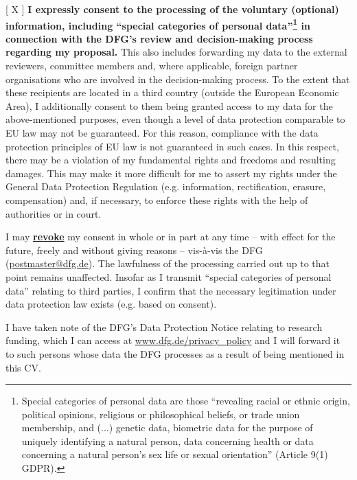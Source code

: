 \documentclass[english]{dfgcv}
\begin{document}
[ X ]
\textbf{I expressly consent to the processing of the voluntary (optional) information, including \enquote{special categories of personal data}\footnote{Special categories of personal data are those \enquote{revealing racial or ethnic origin, political opinions, religious or philosophical beliefs, or trade union membership, and (...) genetic data, biometric data for the purpose of uniquely identifying a natural person, data concerning health or data concerning a natural person's sex life or sexual orientation} (Article 9(1) GDPR).} in connection with the DFG's review and decision-making process regarding my proposal.}
This also includes forwarding my data to the external reviewers, committee members and, where applicable, foreign partner organisations who are involved in the decision-making process. To the extent that these recipients are located in a third country (outside the European Economic Area), I additionally consent to them being granted access to my data for the above-mentioned purposes, even though a level of data protection comparable to EU law may not be guaranteed. For this reason, compliance with the data protection principles of EU law is not guaranteed in such cases. In this respect, there may be a violation of my fundamental rights and freedoms and resulting damages. This may make it more difficult for me to assert my rights under the General Data Protection Regulation (e.g. information, rectification, erasure, compensation) and, if necessary, to enforce these rights with the help of authorities or in court.

I may \textbf{\underline{revoke}} my consent in whole or in part at any time – with effect for the future, freely and without giving reasons – vis-à-vis the DFG (\href{mailto:postmaster@dfg.de}{postmaster@dfg.de}). The lawfulness of the processing carried out up to that point remains unaffected. Insofar as I transmit \enquote{special categories of personal data} relating to third parties, I confirm that the necessary legitimation under data protection law exists (e.g. based on consent).

I have taken note of the DFG's Data Protection Notice relating to research funding, which I can access at \url{www.dfg.de/privacy_policy} and I will forward it to such persons whose data the DFG processes as a result of being mentioned in this CV.
\end{document}
